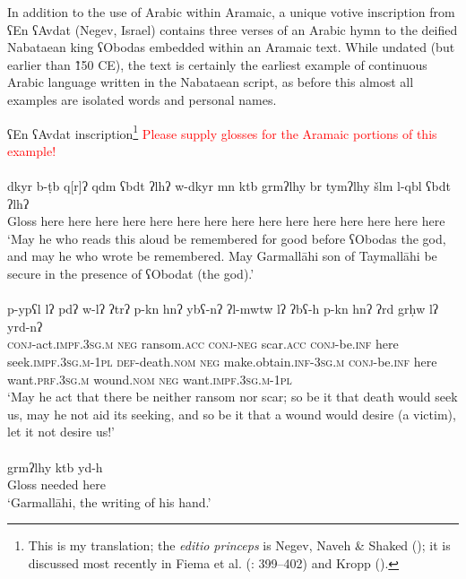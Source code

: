 \documentclass[output=paper]{langsci/langscibook}
\begin{document}
In addition to the use of Arabic within Aramaic, a unique votive inscription from ʕEn ʕAvdat (Negev, Israel) contains three verses of an Arabic hymn to the deified Nabataean king ʕObodas embedded within an Aramaic text. While undated (but earlier than \~150 CE), the text is certainly the earliest example of continuous Arabic language written in the Nabataean script, as before this almost all examples are isolated words and personal names.

\ea ʕEn ʕAvdat inscription\footnote{This is my translation; the \textit{editio princeps} is Negev, Naveh \& Shaked (\citeyear{Negevetal1986}); it is discussed most recently in Fiema et al. (\citeyear{Fiemaetal2015}: 399–402) and Kropp (\citeyear{Kropp2017}).} \textcolor{red}{Please supply glosses for the Aramaic portions of this example!}\\
 \\ 
\gll    dkyr b-ṭb q[r]ʔ qdm ʕbdt ʔlhʔ w-dkyr mn ktb grmʔlhy br tymʔlhy šlm l-qbl ʕbdt ʔlhʔ \\
Gloss here here here here here here here here here here here here here here here \\ 
\glt `May he who reads this aloud be remembered for good before ʕObodas the god, and may he who wrote be remembered. May Garmallāhi son of Taymallāhi be secure in the presence of ʕObodat (the god).'\\

 \\
\gll   p-ypʕl lʔ pdʔ w-lʔ ʔtrʔ p-kn hnʔ ybʕ-nʔ ʔl-mwtw lʔ ʔbʕ-h p-kn hnʔ ʔrd grḥw lʔ yrd-nʔ \\
       \textsc{conj}-act.\textsc{impf.3sg.m} \textsc{neg} ransom.\textsc{acc} \textsc{conj}-\textsc{neg} scar.\textsc{acc} \textsc{conj}-be.\textsc{inf} here seek.\textsc{impf.3sg.m-1pl} \textsc{def}-death.\textsc{nom} \textsc{neg} make.obtain.\textsc{inf-3sg.m} \textsc{conj}-be.\textsc{inf} here want.\textsc{prf.3sg.m} wound.\textsc{nom} \textsc{neg} want.\textsc{impf.3sg.m-1pl} \\
\glt `May he act that there be neither ransom nor scar; so be it that death would seek us, may he not aid its seeking, and so be it that a wound would desire (a victim), let it not desire us!'\\

 \\
\gll   grmʔlhy ktb yd-h \\
Gloss needed here \\
\glt `Garmallāhi, the writing of his hand.’\\
\z
\z
\end{document}
